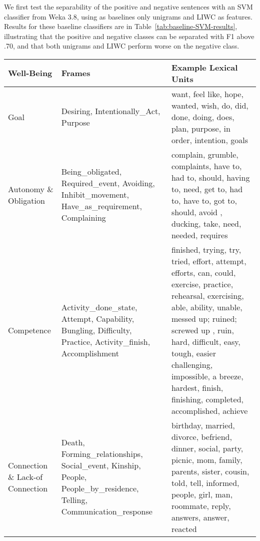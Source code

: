 \documentclass[11pt,letterpaper]{article}
\begin{document}
We first test the separability of the positive and negative sentences with
an SVM classifier from Weka 3.8, using as baselines only unigrams and
LIWC \cite{PennebakerFrancis01} as features.  Results for these
baseline classifiers are in
Table~\ref{tab:baseline-SVM-results}, illustrating that the positive
and negative classes can be separated with F1 above .70, and that
both unigrams and LIWC perform worse on the negative
class. 

\begin{table*}[ht!]
\begin{small}
\centering
\begin{tabular}{p{.65in}|p{2in}|p{3.15in}}
\toprule
\bf Well-Being & \bf Frames & \bf Example Lexical Units \\
\midrule Goal & Desiring, Intentionally\_Act, Purpose & want, feel like, hope,
wanted, wish, do, did, done, doing, does, plan, purpose, in order, intention, goals \\ 
\midrule 
Autonomy \& Obligation & Being\_obligated, Required\_event, Avoiding, Inhibit\_movement, 
Have\_as\_requirement, Complaining & complain, grumble, complaints, have to, had to,
should, having to, need, get to, had to, have to, got to, should, avoid , ducking, take, need, needed, requires\\ 
\midrule 
Competence & Activity\_done\_state, Attempt, Capability, Bungling, Difficulty, Practice, Activity\_finish, Accomplishment & finished, trying, try, tried, effort, attempt, efforts, can, could, exercise, practice, rehearsal, exercising,
able, ability, unable, messed up; ruined; screwed up
, ruin, hard, difficult, easy, tough, easier challenging, impossible, a breeze, hardest, finish, finishing, completed, accomplished, achieve \\
\midrule
Connection \& Lack-of Connection &
Death, Forming\_relationships, Social\_event, Kinship, People, People\_by\_residence, Telling, Communication\_response & 
birthday, married, divorce, befriend, dinner,
social, party, picnic, mom, family, parents, sister, cousin, told,
tell, informed, people, girl, man, roommate, reply, answers, answer, reacted \\ \midrule


\end{tabular}
\end{small}
\end{table*}
\end{document}
